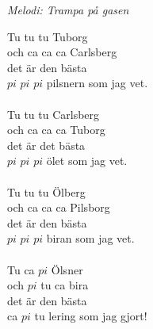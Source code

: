 {\footnotesize\textit{Melodi: Trampa på gasen}}
\vspace{10pt}

Tu tu tu Tuborg\\
och ca ca ca Carlsberg\\
det är den bästa\\
$pi$ $pi$ $pi$ pilsnern som jag vet.\\
\\
Tu tu tu Carlsberg\\
och ca ca ca Tuborg\\
det är det bästa\\
$pi$ $pi$ $pi$ ölet som jag vet.\\
\\
Tu tu tu Ölberg\\
och ca ca ca Pilsborg\\
det är den bästa\\
$pi$ $pi$ $pi$ biran som jag vet.\\
\\
Tu ca $pi$ Ölsner\\
och $pi$ tu ca bira\\
det är den bästa\\
ca $pi$ tu lering som jag gjort!
